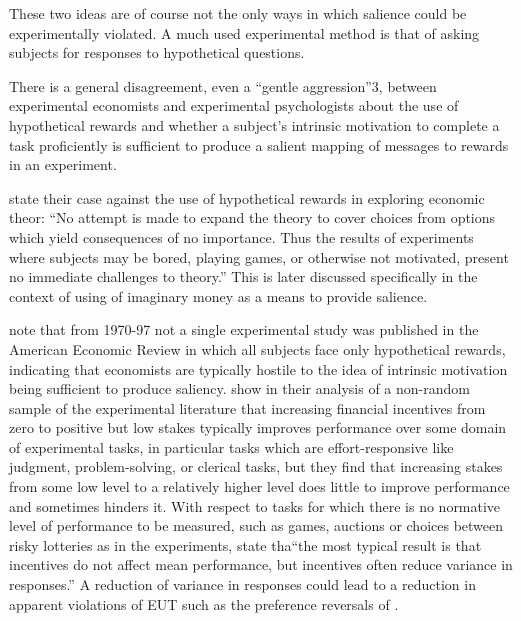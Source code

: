\documentclass[../main.tex]{subfiles}
\begin{document}
These two ideas are of course not the only ways in which salience could be experimentally violated.
A much used experimental method is that of asking subjects for responses to hypothetical questions.

There is a general disagreement, even a \enquote{gentle aggression}3, between experimental economists and experimental psychologists about the use of hypothetical rewards and whether a subject's intrinsic motivation to complete a task proficiently is sufficient to produce a salient mapping of messages to  rewards in an experiment.


\textcite[624]{Grether1979} state their case against the use of hypothetical rewards in exploring economic theor:
\enquote{No attempt is made to expand the theory to cover choices from options which yield consequences of no importance.\textelp{} Thus the results of experiments where subjects may be bored, playing games, or otherwise not motivated, present no immediate challenges to theory.} 
This is later discussed specifically in the context of using of imaginary money as a means to provide salience.

\textcite[31]{Camerer1999} note that from 1970-97 not a single experimental study was published in the American Economic Review in which all subjects face only hypothetical rewards, indicating that economists are typically hostile to the idea of intrinsic motivation being sufficient to produce saliency.
\textcite{Camerer1999} show in their analysis of a non-random sample of the experimental literature that increasing financial incentives from zero to positive but low stakes typically improves performance over some domain of experimental tasks, in particular tasks which are effort-responsive like judgment, problem-solving, or clerical tasks, but they find that increasing stakes from some low level to a relatively higher level does little to improve performance and sometimes hinders it.
With respect to tasks for which there is no normative level of performance to be measured, such as games, auctions or choices between risky lotteries as in the \textcite{Grether1979} experiments, \textcite[34]{Camerer1999} state tha\enquote{the most typical result is that incentives do not affect mean performance, but incentives often reduce variance in responses.}
A reduction of variance in responses could lead to a reduction in apparent violations of EUT such as the preference reversals of \textcite{Grether1979}.
\end{document}
